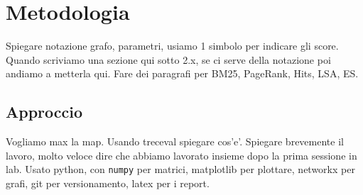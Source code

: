 \section{Metodologia}
\label{sec:metodologia}

Spiegare notazione grafo, parametri, usiamo 1 simbolo per indicare gli score. Quando scriviamo una sezione qui sotto 2.x, se ci serve della notazione poi andiamo a metterla qui. 
Fare dei paragrafi per BM25, PageRank, Hits, LSA, ES.


\subsection{Approccio}
\label{sec:approccio}

Vogliamo max la map. Usando treceval spiegare cos'e'. Spiegare brevemente il lavoro, molto veloce dire che abbiamo lavorato insieme dopo la prima sessione in lab. Usato python, con \texttt{numpy} per matrici, matplotlib per plottare, networkx per grafi, git per versionamento, latex per i report.

